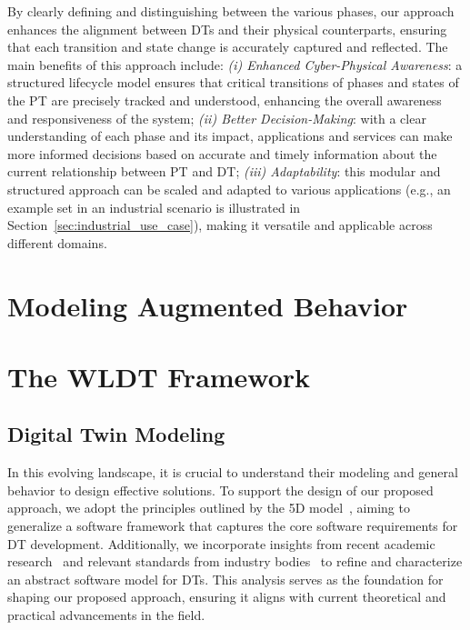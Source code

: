 By clearly defining and distinguishing between the various phases, our approach enhances the alignment between DTs and their physical counterparts, ensuring that each transition and state change is accurately captured and reflected. The main benefits of this approach include: 
\textit{(i) Enhanced Cyber-Physical Awareness}: a structured lifecycle model ensures that critical transitions of phases and states of the PT are precisely tracked and understood, enhancing the overall awareness and responsiveness of the system;
\textit{(ii) Better Decision-Making}: with a clear understanding of each phase and its impact, applications and services can make more informed decisions based on accurate and timely information about the current relationship between PT and DT;
\textit{(iii) Adaptability}: this modular and structured approach can be scaled and adapted to various applications (e.g., an example set in an industrial scenario is illustrated in Section~\ref{sec:industrial_use_case}), making it versatile and applicable across different domains.




\section{Modeling Augmented Behavior}


\section{The \acl{WLDT} Framework}


\subsection{Digital Twin Modeling}
\label{sec:dt_modelling}

In this evolving landscape, it is crucial to understand their modeling and general behavior to design effective solutions.
To support the design of our proposed approach, we adopt the principles outlined by the 5D model~\cite{dt-driven-prognostics-tao-2018}, aiming to generalize a software framework that captures the core software requirements for DT development.
Additionally, we incorporate insights from recent academic research~\cite{web_of_dt,bellavista2023requirements} and relevant standards from industry bodies~\cite{etsi_dt_comm_requirements} to refine and characterize an abstract software model for DTs.
This analysis serves as the foundation for shaping our proposed approach, ensuring it aligns with current theoretical and practical advancements in the field.

